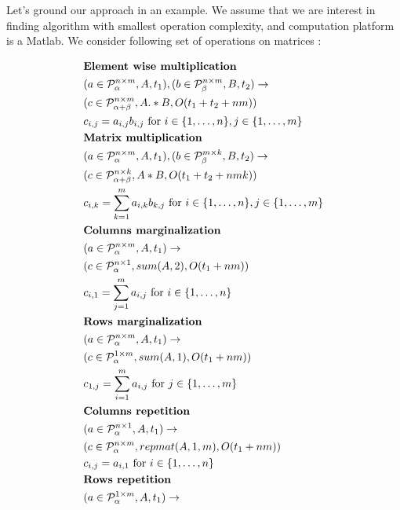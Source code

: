 \documentclass{article}
\begin{document}
Let's ground our approach in an example. We assume that we are interest in
finding algorithm with smallest operation complexity, and computation platform
is a Matlab.  We consider following set of operations on matrices : 

\begin{align*}
&\text{{\bf Element wise multiplication}}\\
&(a \in \mathcal{P}^{n \times m}_\alpha, A, t_1), (b \in \mathcal{P}^{n \times m}_\beta, B, t_2) \rightarrow \\ 
&(c \in \mathcal{P}^{n \times m}_{\alpha + \beta}, A .* B, O(t_1 + t_2 + nm)) \\
&c_{i,j} = a_{i,j}b_{i, j} \text{ for } i \in \{1, \dots, n\}, j \in \{1, \dots, m\} \\
&\text{{\bf Matrix multiplication}}\\
&(a \in \mathcal{P}^{n \times m}_\alpha, A, t_1), (b \in \mathcal{P}^{m \times k}_\beta, B, t_2) \rightarrow \\ 
&(c \in \mathcal{P}^{n \times k}_{\alpha + \beta}, A * B, O(t_1 + t_2 + nmk)) \\
&c_{i,k} = \sum_{k = 1}^m a_{i,k}b_{k, j} \text{ for } i \in \{1, \dots, n\}, j \in \{1, \dots, m\} \\
&\text{{\bf Columns marginalization}}\\
&(a \in \mathcal{P}^{n \times m}_\alpha, A, t_1) \rightarrow \\ 
&(c \in \mathcal{P}^{n \times 1}_\alpha, sum(A, 2), O(t_1 + nm)) \\
&c_{i, 1} = \sum_{j = 1}^m a_{i, j} \text{ for } i \in \{1, \dots, n\}\\
&\text{{\bf Rows marginalization}}\\
&(a \in \mathcal{P}^{n \times m}_\alpha, A, t_1) \rightarrow \\ 
&(c \in \mathcal{P}^{1 \times m}_\alpha, sum(A, 1), O(t_1 + nm)) \\
&c_{1, j} = \sum_{i = 1}^m a_{i, j} \text{ for } j \in \{1, \dots, m\}\\
&\text{{\bf Columns repetition}}\\
&(a \in \mathcal{P}^{n \times 1}_\alpha, A, t_1) \rightarrow \\ 
&(c \in \mathcal{P}^{n \times m}_\alpha, repmat(A, 1, m), O(t_1 + nm)) \\
&c_{i, j} = a_{i, 1} \text{ for } i \in \{1, \dots, n\}\\
&\text{{\bf Rows repetition}}\\
&(a \in \mathcal{P}^{1 \times m}_\alpha, A, t_1) \rightarrow \\ 

\end{align*}
\end{document}
